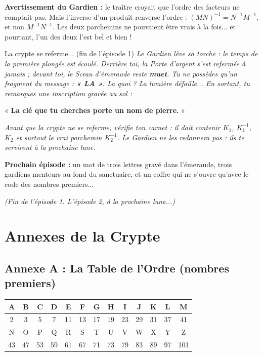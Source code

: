 \documentclass[11pt,a4paper]{article}
\begin{document}
\begin{piege}
\textbf{Avertissement du Gardien :} le traître croyait que l'ordre des
facteurs ne comptait pas. Mais l'inverse d'un produit renverse l'ordre :
$(MN)^{-1} = N^{-1}M^{-1}$, et non $M^{-1}N^{-1}$. Les deux parchemins ne
pouvaient être vrais à la fois... et pourtant, l'un des deux l'est bel et
bien !
\end{piege}

\begin{missive}{La crypte se referme... (fin de l'épisode 1)}
\itshape
Le Gardien lève sa torche : le temps de la première plongée est écoulé.
Derrière toi, la Porte d'argent s'est refermée à jamais ; devant toi, le
Sceau d'émeraude reste \textbf{muet}. Tu ne possèdes qu'un fragment du
message : \textbf{« LA »}. La quoi ? La lumière défaille... En sortant,
tu remarques une inscription gravée au sol :
\upshape
\begin{center}
« \textbf{La clé que tu cherches porte un nom de pierre.} »
\end{center}
\itshape
Avant que la crypte ne se referme, vérifie ton carnet : il doit contenir
$K_1$, $K_1^{-1}$, $K_2$ et surtout le vrai parchemin $K_2^{-1}$.
Le Gardien ne les redonnera pas : ils te serviront à la prochaine lune.
\upshape

\textbf{Prochain épisode :} un mot de trois lettres gravé dans
l'émeraude, trois gardiens menteurs au fond du sanctuaire, et un coffre
qui ne s'ouvre qu'avec le code des nombres premiers...
\end{missive}

\begin{center}
\itshape (Fin de l'épisode 1. L'épisode 2, à la prochaine lune...)
\end{center}

\newpage
\section*{Annexes de la Crypte}

\subsection*{Annexe A : La Table de l'Ordre (nombres premiers)}
\begin{center}
	\begin{tabular}{*{13}{c}}
		\toprule
		A & B & C & D & E & F & G & H & I & J & K & L & M\\
		\midrule
		2 & 3 & 5 & 7 & 11 & 13 & 17 & 19 & 23 & 29 & 31 & 37 & 41\\
		\midrule
		N & O & P & Q & R & S & T & U & V & W & X & Y & Z\\
		\midrule
		43 & 47 & 53 & 59 & 61 & 67 & 71 & 73 & 79 & 83 & 89 & 97 & 101\\
		\bottomrule
	\end{tabular}
\end{center}
\end{document}
